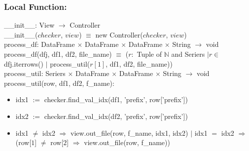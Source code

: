 \documentclass[12pt]{article}
\begin{document}

\subsubsection*{Local Function:}

\_\_init\_\_: View $\rightarrow$ Controller \\
\_\_init\_\_($checker$, $view$) $\equiv$ new Controller($checker$, $view$) \\

\noindent process\_df: DataFrame $\times$ DataFrame $\times$ DataFrame $\times$ String $\rightarrow$ void \\
process\_df(dfj, df1, df2, file\_name) $\equiv$ ($r:$ Tuple of $\mathbb{N}$ and Seriers $| r \in$ dfj.iterrows() $|$ 
process\_util($r[1]$, df1, df2, file\_name)) \\

\noindent process\_util: Seriers $\times$ DataFrame $\times$ DataFrame $\times$ String $\rightarrow$ void \\
process\_util(row, df1, df2, f\_name):
\begin{itemize}[\null]
  \item idx1 $:=$ checker.find\_val\_idx(df1, 'prefix', row['prefix']) %
  \item idx2 $:=$ checker.find\_val\_idx(df2, 'prefix', row['prefix']) %
  \item idx1 $\neq$ idx2 $\Rightarrow$ view.out\_file(row, f\_name, idx1, idx2) $|$
  idx1 $=$ idx2 $\Rightarrow$ (row[$1$] $\neq$ row[$2$] $\Rightarrow$ view.out\_file(row, f\_name)) 
\end{itemize}



\end{document}
